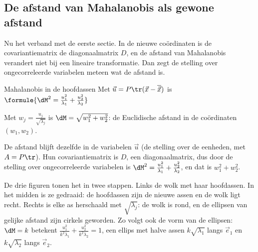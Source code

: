 \begin{oefeningen}
\end{oefeningen}

\subsection{De afstand van Mahalanobis als gewone afstand}

Nu het verband met de eerste sectie. In de nieuwe coördinaten is de covariantiematrix de diagonaalmatrix $D$, en de afstand van Mahalanobis verandert niet bij een lineaire transformatie. Dan zegt de stelling over ongecorreleerde variabelen meteen wat de afstand is.

\begin{theorie}
\begin{stelling}{Mahalanobis in de hoofdassen}
Met $\vec u = P\tr(\vec x - \overline{\vec x})$ is \qquad $\formule{\dM^2 = \frac{u_1^2}{\lambda_1} + \frac{u_2^2}{\lambda_2}}$

\smallskip
Met $w_j = \frac{u_j}{\sqrt{\lambda_j}}$ is $\dM = \sqrt{w_1^2 + w_2^2}$: de Euclidische afstand in de coördinaten $(w_1, w_2)$.
\end{stelling}

\begin{bewijs}
De afstand blijft dezelfde in de variabelen $\vec u$ (de stelling over de eenheden, met $A = P\tr$). Hun covariantiematrix is $D$, een diagonaalmatrix, dus door de stelling over ongecorreleerde variabelen is $\dM^2 = \frac{u_1^2}{\lambda_1} + \frac{u_2^2}{\lambda_2}$, en dat is $w_1^2 + w_2^2$.
\end{bewijs}
\end{theorie}

De drie figuren tonen het in twee stappen. Links de wolk met haar hoofdassen. In het midden is ze gedraaid: de hoofdassen zijn de nieuwe assen en de wolk ligt recht. Rechts is elke as herschaald met $\sqrt{\lambda_j}$: de wolk is rond, en de ellipsen van gelijke afstand zijn cirkels geworden. Zo volgt ook de vorm van de ellipsen: $\dM = k$ betekent $\frac{u_1^2}{k^2\lambda_1} + \frac{u_2^2}{k^2\lambda_2} = 1$, een ellips met halve assen $k\sqrt{\lambda_1}$ langs $\vec e_1$ en $k\sqrt{\lambda_2}$ langs $\vec e_2$.

